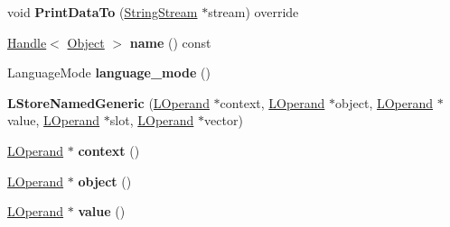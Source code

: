 \begin{DoxyCompactItemize}
\item 
void {\bfseries Print\+Data\+To} (\hyperlink{classv8_1_1internal_1_1_string_stream}{String\+Stream} $\ast$stream) override\hypertarget{classv8_1_1internal_1_1_l_store_named_generic_a71e5fdb3cd3c873fcaace82fa3a0291b}{}\label{classv8_1_1internal_1_1_l_store_named_generic_a71e5fdb3cd3c873fcaace82fa3a0291b}

\item 
\hyperlink{classv8_1_1internal_1_1_handle}{Handle}$<$ \hyperlink{classv8_1_1internal_1_1_object}{Object} $>$ {\bfseries name} () const \hypertarget{classv8_1_1internal_1_1_l_store_named_generic_a0fcb3f4bcaad0355374c20f5f3d215ab}{}\label{classv8_1_1internal_1_1_l_store_named_generic_a0fcb3f4bcaad0355374c20f5f3d215ab}

\item 
Language\+Mode {\bfseries language\+\_\+mode} ()\hypertarget{classv8_1_1internal_1_1_l_store_named_generic_a9aaa8911322a00bb960fa5f3e132ee3c}{}\label{classv8_1_1internal_1_1_l_store_named_generic_a9aaa8911322a00bb960fa5f3e132ee3c}

\item 
{\bfseries L\+Store\+Named\+Generic} (\hyperlink{classv8_1_1internal_1_1_l_operand}{L\+Operand} $\ast$context, \hyperlink{classv8_1_1internal_1_1_l_operand}{L\+Operand} $\ast$object, \hyperlink{classv8_1_1internal_1_1_l_operand}{L\+Operand} $\ast$value, \hyperlink{classv8_1_1internal_1_1_l_operand}{L\+Operand} $\ast$slot, \hyperlink{classv8_1_1internal_1_1_l_operand}{L\+Operand} $\ast$vector)\hypertarget{classv8_1_1internal_1_1_l_store_named_generic_a5e3f7dd8c808499319eaac553c49aea7}{}\label{classv8_1_1internal_1_1_l_store_named_generic_a5e3f7dd8c808499319eaac553c49aea7}

\item 
\hyperlink{classv8_1_1internal_1_1_l_operand}{L\+Operand} $\ast$ {\bfseries context} ()\hypertarget{classv8_1_1internal_1_1_l_store_named_generic_ae430bd465f69e64a24f1f9f99a9c91ad}{}\label{classv8_1_1internal_1_1_l_store_named_generic_ae430bd465f69e64a24f1f9f99a9c91ad}

\item 
\hyperlink{classv8_1_1internal_1_1_l_operand}{L\+Operand} $\ast$ {\bfseries object} ()\hypertarget{classv8_1_1internal_1_1_l_store_named_generic_aa1b18be662cea0c3778374ff8b43defe}{}\label{classv8_1_1internal_1_1_l_store_named_generic_aa1b18be662cea0c3778374ff8b43defe}

\item 
\hyperlink{classv8_1_1internal_1_1_l_operand}{L\+Operand} $\ast$ {\bfseries value} ()\hypertarget{classv8_1_1internal_1_1_l_store_named_generic_aec8db1a93603a3b4113708cbceebcec8}{}\label{classv8_1_1internal_1_1_l_store_named_generic_aec8db1a93603a3b4113708cbceebcec8}


\end{DoxyCompactItemize}
